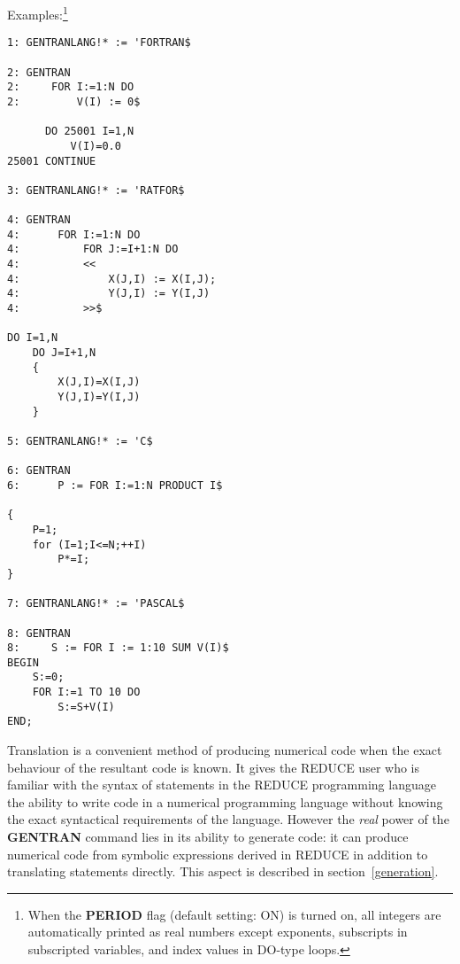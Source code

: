 \begin{describe}{Examples:\footnote{When the {\bf PERIOD} flag (default
setting:  ON) is turned on, all
integers are automatically printed as real numbers except exponents,
subscripts in subscripted variables, and index values in DO-type loops.}}
\begin{verbatim}
1: GENTRANLANG!* := 'FORTRAN$

2: GENTRAN
2:     FOR I:=1:N DO
2:         V(I) := 0$

      DO 25001 I=1,N
          V(I)=0.0
25001 CONTINUE

3: GENTRANLANG!* := 'RATFOR$ 

4: GENTRAN 
4:      FOR I:=1:N DO 
4:          FOR J:=I+1:N DO 
4:          << 
4:              X(J,I) := X(I,J); 
4:              Y(J,I) := Y(I,J) 
4:          >>$ 

DO I=1,N
    DO J=I+1,N
    {
        X(J,I)=X(I,J)
        Y(J,I)=Y(I,J)
    }

5: GENTRANLANG!* := 'C$ 

6: GENTRAN 
6:      P := FOR I:=1:N PRODUCT I$ 

{
    P=1;
    for (I=1;I<=N;++I)
        P*=I;
}

7: GENTRANLANG!* := 'PASCAL$

8: GENTRAN
8:     S := FOR I := 1:10 SUM V(I)$
BEGIN
    S:=0;
    FOR I:=1 TO 10 DO
        S:=S+V(I)
END;
\end{verbatim}
\end{describe}
Translation is a convenient method of producing
numerical code when the exact behaviour of
the resultant code is known.  It gives the REDUCE user
who is familiar with the syntax of statements in the REDUCE
programming language the ability to write code in a numerical
programming language without knowing the exact syntactical requirements
of the language.  However the {\em real} power of the {\bf GENTRAN}
command lies in its ability to generate code:  it can produce
numerical code from symbolic expressions derived in REDUCE in addition to
translating statements directly.  This aspect is described in 
section~\ref{generation}.

